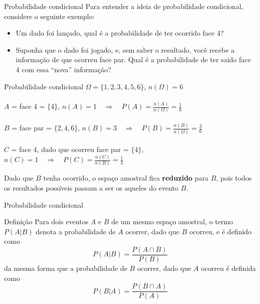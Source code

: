 \documentclass[10pt]{beamer}\usepackage[]{graphicx}\usepackage[]{color}
\theoremstyle{definition}
\begin{document}
\begin{frame}{Probabilidade condicional}
 Para entender a ideia de probabilidade condicional, considere o
 seguinte exemplo:
 \begin{itemize}
 \item Um dado foi lançado, qual é a probabilidade de ter ocorrido face
   4?
 \item Suponha que o dado foi jogado, e, sem saber o resultado, você
   recebe a informação de que ocorreu face par. Qual é a probabilidade
   de ter saido face 4 com essa ``nova'' informação?
 \end{itemize}
\end{frame}

\begin{frame}{Probabilidade condicional}
$\Omega = \{1,2,3,4,5,6\}$, $n(\Omega) = 6$ \\~\\
$A$ = face 4 = $\{4\}$, $n(A) = 1 \quad \Rightarrow \quad P(A) =
    \frac{n(A)}{n(\Omega)} = \frac{1}{6}$ \\~\\
$B$ = face par = $\{2,4,6\}$, $n(B) = 3 \quad \Rightarrow \quad
P(B) = \frac{n(B)}{n(\Omega)} = \frac{3}{6}$ \\~\\
$C$ = face 4, dado que ocorreu face par = $\{4\}$, $n(C) = 1
\quad \Rightarrow \quad P(C) = \frac{n(C)}{n(B)} = \frac{1}{3}$
\begin{alertblock}{}
  Dado que $B$ tenha ocorrido, o espaço amostral fica \textbf{reduzido}
  para $B$, pois todos os resultados possíveis passam a ser os aqueles
  do evento $B$.
\end{alertblock}
\end{frame}

\begin{frame}{Probabilidade condicional}
  \begin{block}{Definição}
    Para dois eventos $A$ e $B$ de um mesmo espaço amostral, o
    termo $P(A|B)$ denota a probabilidade de $A$ ocorrer, dado que $B$
    ocorreu, e é definido como
    \begin{equation*}
      P(A|B) = \frac{P(A \cap B)}{P(B)}
    \end{equation*}
    da mesma forma que a probabilidade de $B$ ocorrer, dado que $A$
    ocorreu é definida como
    \begin{equation*}
      P(B|A) = \frac{P(B \cap A)}{P(A)}
    \end{equation*}
  \end{block}
\end{frame}
\end{document}
